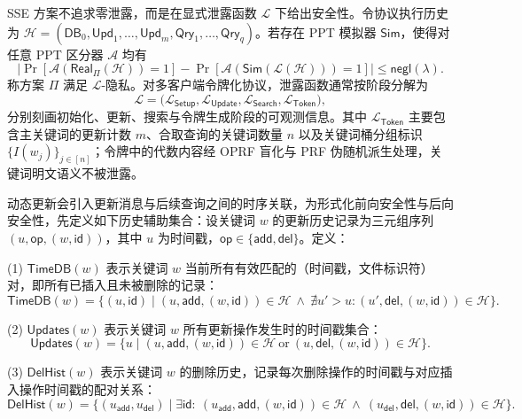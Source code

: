 \begin{definition}[$\mathcal{L}$-隐私]\label{def:l-privacy}
SSE 方案不追求零泄露，而是在显式泄露函数 $\mathcal{L}$ 下给出安全性。令协议执行历史为 $\mathcal{H}=(\mathsf{DB}_0,\mathsf{Upd}_1,\ldots,\mathsf{Upd}_m,\mathsf{Qry}_1,\ldots,\mathsf{Qry}_q)$。若存在 PPT 模拟器 $\mathsf{Sim}$，使得对任意 PPT 区分器 $\mathcal{A}$ 均有\cite{10.1145/1180405.1180417,10.1145/2636328,10.1007/978-3-642-17373-8_33}
\begin{equation}
\left|
\Pr\!\left[\mathcal{A}\!\left(\mathsf{Real}_{\Pi}(\mathcal{H})\right)=1\right]
-\Pr\!\left[\mathcal{A}\!\left(\mathsf{Sim}\!\left(\mathcal{L}(\mathcal{H})\right)\right)=1\right]
\right|
\le \mathsf{negl}(\lambda).
\end{equation}
称方案 $\Pi$ 满足 $\mathcal{L}$-隐私。对多客户端令牌化协议，泄露函数通常按阶段分解为
\[
\mathcal{L}=\big(\mathcal{L}_{\mathsf{Setup}},\mathcal{L}_{\mathsf{Update}},\mathcal{L}_{\mathsf{Search}},\mathcal{L}_{\mathsf{Token}}\big),
\]
分别刻画初始化、更新、搜索与令牌生成阶段的可观测信息。其中 $\mathcal{L}_{\mathsf{Token}}$ 主要包含主关键词的更新计数 $m$、合取查询的关键词数量 $n$ 以及关键词桶分组标识 $\{I(w_j)\}_{j\in[n]}$；令牌中的代数内容经 OPRF 盲化与 PRF 伪随机派生处理，关键词明文语义不被泄露\cite{10.1145/3634737.3657018}。
\end{definition}

动态更新会引入更新消息与后续查询之间的时序关联，为形式化前向安全性与后向安全性，先定义如下历史辅助集合：设关键词 $w$ 的更新历史记录为三元组序列 $(u,\mathsf{op},(w,\mathsf{id}))$，其中 $u$ 为时间戳，$\mathsf{op}\in\{\mathsf{add},\mathsf{del}\}$。定义：

\textup{(1)} $\mathsf{TimeDB}(w)$ 表示关键词 $w$ 当前所有有效匹配的（时间戳，文件标识符）对，即所有已插入且未被删除的记录：
\begin{equation}
\mathsf{TimeDB}(w) = \{(u,\mathsf{id})\mid (u,\mathsf{add},(w,\mathsf{id}))\in\mathcal{H}\ \land \ \nexists u'>u:(u',\mathsf{del},(w,\mathsf{id}))\in\mathcal{H}\}.\label{eq:timedb}
\end{equation}

\textup{(2)} $\mathsf{Updates}(w)$ 表示关键词 $w$ 所有更新操作发生时的时间戳集合：
\begin{equation}
\mathsf{Updates}(w) = \{u\mid (u,\mathsf{add},(w,\mathsf{id}))\in\mathcal{H}\ \text{or}\ (u,\mathsf{del},(w,\mathsf{id}))\in\mathcal{H}\}.\label{eq:updates}
\end{equation}

\textup{(3)} $\mathsf{DelHist}(w)$ 表示关键词 $w$ 的删除历史，记录每次删除操作的时间戳与对应插入操作时间戳的配对关系：
\begin{equation}
\mathsf{DelHist}(w) = \{(u_{\mathsf{add}},u_{\mathsf{del}})\mid \exists \mathsf{id}:\ (u_{\mathsf{add}},\mathsf{add},(w,\mathsf{id}))\in\mathcal{H}\ \land \ (u_{\mathsf{del}},\mathsf{del},(w,\mathsf{id}))\in\mathcal{H}\}.\label{eq:delhist}
\end{equation}

